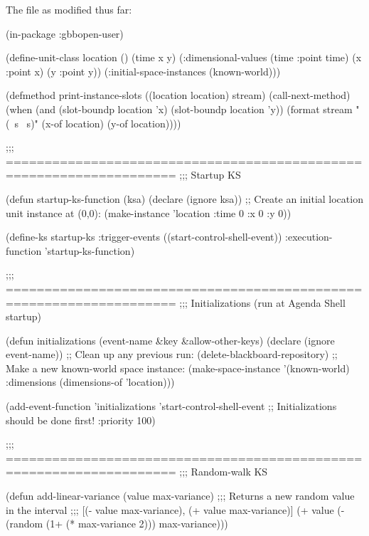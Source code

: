 \documentclass[10pt,twoside,english,pdftex]{article}
\begin{document}
\begin{tightitemize}
\item The  file as modified thus far:
\end{tightitemize}
%
\begin{example}
\W\supp
  (in-package :gbbopen-user)

  (define-unit-class location ()
    (time 
     x y)
    (:dimensional-values
      (time :point time)
      (x :point x)
      (y :point y))
    (:initial-space-instances (known-world)))

  (defmethod print-instance-slots ((location location) stream)
    (call-next-method)
    (when (and (slot-boundp location 'x)
               (slot-boundp location 'y))
      (format stream " (~s ~s)"
              (x-of location)
              (y-of location))))

  ;;; ====================================================================
  ;;;   Startup KS

  (defun startup-ks-function (ksa)
    (declare (ignore ksa))
    ;; Create an initial location unit instance at (0,0):
    (make-instance 'location :time 0 :x 0 :y 0))

  (define-ks startup-ks
      :trigger-events ((start-control-shell-event))
      :execution-function 'startup-ks-function)

  ;;; ====================================================================
  ;;;   Initializations (run at Agenda Shell startup)

  (defun initializations (event-name &key &allow-other-keys)
    (declare (ignore event-name))
    ;; Clean up any previous run:
    (delete-blackboard-repository)
    ;; Make a new known-world space instance:
    (make-space-instance 
     '(known-world)
     :dimensions (dimensions-of 'location)))

  (add-event-function 'initializations 'start-control-shell-event
                      ;; Initializations should be done first!
                      :priority 100)

  ;;; ====================================================================
  ;;;   Random-walk KS

  (defun add-linear-variance (value max-variance)
    ;;; Returns a new random value in the interval
    ;;; [(- value max-variance), (+ value max-variance)]
    (+ value (- (random (1+ (* max-variance 2))) max-variance)))


\end{example}
\end{document}
